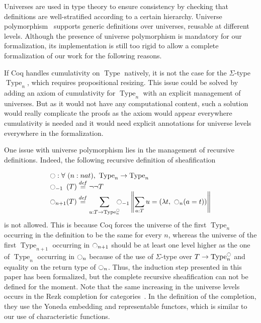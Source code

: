 \documentclass[notfinal]{jfrarticle}
\DeclareMathOperator{\Type}{Type}
\newcommand \defeq {\overset{de\hspace{-0.2ex}f}{=}}
\newcommand{\modal}{\ensuremath{\ocircle}}
\begin{document}
Universes are used in type theory to ensure consistency by checking
that definitions are well-stratified according to a certain hierarchy.
%
Universe polymorphism~\cite{sozeau2014universe} supports generic
definitions over universes, reusable at different levels.
%
Although the presence of universe polymorphism is mandatory for our
formalization, its implementation is still too rigid to allow a
complete formalization of our work for the following reasons.

%
If Coq handles cumulativity on $\Type$ natively, it is not
the case for the $\Sigma$-type $\Type_n$, which requires propositional
resizing. 
%
This issue could be solved by adding an axiom of cumulativity
for $\Type_n$ with an explicit management of universes. 
%
But as it would not have any computational content, such a solution
would really complicate the proofs as the axiom would appear
everywhere cumulativity is needed and it would need explicit
annotations for universe levels everywhere in the formalization.
%

One issue with universe polymorphism lies in the management of
recursive definitions. Indeed, the following recursive definition of
sheafification

%
\[ \begin{array}{l}
   \modal : \forall \ (n : nat), \ \Type_n \to \Type_n 
   \\
    \modal_{-1\phantom{n}}(T) \defeq\lnot\lnot T \\

      \displaystyle{\modal_{n+1}(T)} \defeq  
      \displaystyle{\sum_{u:T \to \Type_n^\modal} \!\!\!\!\modal_{-1} 
      \left\|
      \sum_{a:T} u= (\lambda t,~\modal_n (a=t))
      \right\|}
    \end{array}
\]
%
is not allowed. 
%
This is because Coq forces the universe of the first $\Type_n$
occurring in the definition to be the same for every $n$, whereas the
universe of the first $\Type_{n+1}$ occurring in $\modal_{n+1}$ should be at
least one level higher as the one of $\Type_n$ occurring in
$\modal_{n}$ because of the use of $\Sigma$-type over
$T \to \Type_n^\modal$ and equality on the return type of $\modal_n$.
%
%
Thus, the induction step presented in this paper has been formalized,
but the complete recursive sheafification can not be defined for the
moment.
%
Note that the same increasing in the universe levels occurs in the
Rezk completion for categories~\cite{rezk}. In the definition of the
completion, they use the Yoneda embedding and representable functors,
which is similar to our use of characteristic functions.
 
\end{document}
